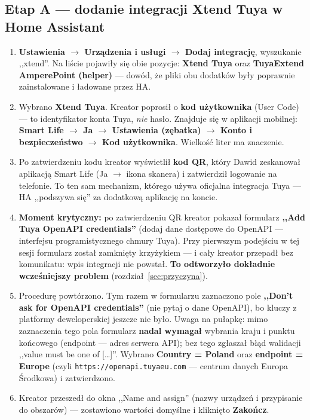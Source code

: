 \documentclass[11pt,a4paper]{article}
\begin{document}
\subsection{Etap A --- dodanie integracji Xtend Tuya w Home Assistant}

\begin{enumerate}
\item \textbf{Ustawienia $\to$ Urządzenia i usługi $\to$ Dodaj integrację}, wyszukanie ,,xtend''. Na liście pojawiły się obie pozycje: \textbf{Xtend Tuya} oraz \textbf{TuyaExtend AmperePoint (helper)} --- dowód, że pliki obu dodatków były poprawnie zainstalowane i ładowane przez HA.
\item Wybrano \textbf{Xtend Tuya}. Kreator poprosił o \textbf{kod użytkownika} (User Code) --- to identyfikator konta Tuya, \emph{nie} hasło. Znajduje się w aplikacji mobilnej: \textbf{Smart Life $\to$ Ja $\to$ Ustawienia (zębatka) $\to$ Konto i bezpieczeństwo $\to$ Kod użytkownika}. Wielkość liter ma znaczenie.
\item Po zatwierdzeniu kodu kreator wyświetlił \textbf{kod QR}, który Dawid zeskanował aplikacją Smart Life (Ja $\to$ ikona skanera) i zatwierdził logowanie na telefonie. To ten sam mechanizm, którego używa oficjalna integracja Tuya --- HA ,,podszywa się'' za dodatkową aplikację na koncie.
\item \textbf{Moment krytyczny:} po zatwierdzeniu QR kreator pokazał formularz \textbf{,,Add Tuya OpenAPI credentials''} (dodaj dane dostępowe do OpenAPI --- interfejsu programistycznego chmury Tuya). Przy pierwszym podejściu w tej sesji formularz został zamknięty krzyżykiem --- i cały kreator przepadł bez komunikatu: wpis integracji nie powstał. \textbf{To odtworzyło dokładnie wcześniejszy problem} (rozdział~\ref{sec:przyczyna}).
\item Procedurę powtórzono. Tym razem w formularzu zaznaczono pole \textbf{,,Don't ask for OpenAPI credentials''} (nie pytaj o dane OpenAPI), bo kluczy z platformy deweloperskiej jeszcze nie było. Uwaga na pułapkę: mimo zaznaczenia tego pola formularz \textbf{nadal wymagał} wybrania kraju i punktu końcowego (endpoint --- adres serwera API); bez tego zgłaszał błąd walidacji ,,value must be one of [\ldots]''. Wybrano \textbf{Country = Poland} oraz \textbf{endpoint = Europe} (czyli \texttt{https://openapi.tuyaeu.com} --- centrum danych Europa Środkowa) i zatwierdzono.
\item Kreator przeszedł do okna ,,Name and assign'' (nazwy urządzeń i przypisanie do obszarów) --- zostawiono wartości domyślne i kliknięto \textbf{Zakończ}.
\end{enumerate}
\end{document}
